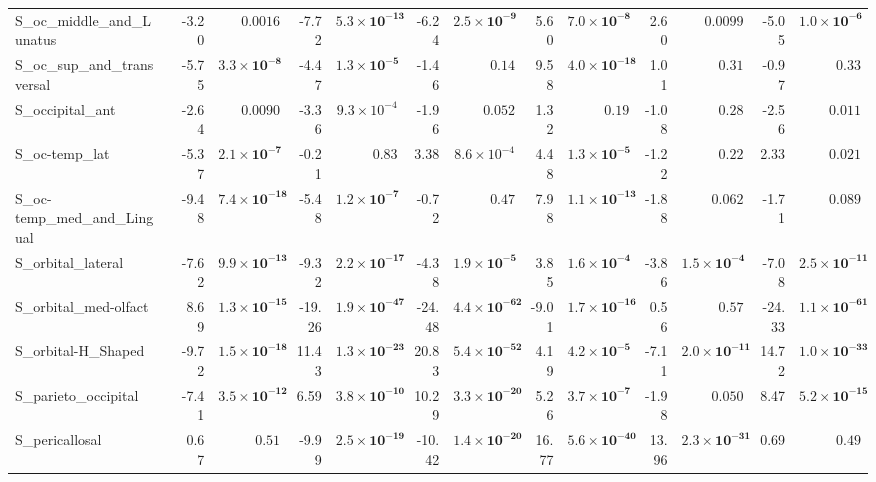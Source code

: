 {\begin{longtable}{llrrrrrrrrrrrr}
S\_oc\_middle\_and\_Lunatus &  & -3.20 & $0.0016$ & -7.72 & $\mathbf{5.3{\times}10^{-13}}$ & -6.24 & $\mathbf{2.5{\times}10^{-9}}$ & 5.60 & $\mathbf{7.0{\times}10^{-8}}$ & 2.60 & $0.0099$ & -5.05 & $\mathbf{1.0{\times}10^{-6}}$ \\
S\_oc\_sup\_and\_transversal &  & -5.75 & $\mathbf{3.3{\times}10^{-8}}$ & -4.47 & $\mathbf{1.3{\times}10^{-5}}$ & -1.46 & $0.14$ & 9.58 & $\mathbf{4.0{\times}10^{-18}}$ & 1.01 & $0.31$ & -0.97 & $0.33$ \\
S\_occipital\_ant &  & -2.64 & $0.0090$ & -3.36 & $9.3{\times}10^{-4}$ & -1.96 & $0.052$ & 1.32 & $0.19$ & -1.08 & $0.28$ & -2.56 & $0.011$ \\
S\_oc-temp\_lat &  & -5.37 & $\mathbf{2.1{\times}10^{-7}}$ & -0.21 & $0.83$ & 3.38 & $8.6{\times}10^{-4}$ & 4.48 & $\mathbf{1.3{\times}10^{-5}}$ & -1.22 & $0.22$ & 2.33 & $0.021$ \\
S\_oc-temp\_med\_and\_Lingual &  & -9.48 & $\mathbf{7.4{\times}10^{-18}}$ & -5.48 & $\mathbf{1.2{\times}10^{-7}}$ & -0.72 & $0.47$ & 7.98 & $\mathbf{1.1{\times}10^{-13}}$ & -1.88 & $0.062$ & -1.71 & $0.089$ \\
S\_orbital\_lateral &  & -7.62 & $\mathbf{9.9{\times}10^{-13}}$ & -9.32 & $\mathbf{2.2{\times}10^{-17}}$ & -4.38 & $\mathbf{1.9{\times}10^{-5}}$ & 3.85 & $\mathbf{1.6{\times}10^{-4}}$ & -3.86 & $\mathbf{1.5{\times}10^{-4}}$ & -7.08 & $\mathbf{2.5{\times}10^{-11}}$ \\
S\_orbital\_med-olfact &  & 8.69 & $\mathbf{1.3{\times}10^{-15}}$ & -19.26 & $\mathbf{1.9{\times}10^{-47}}$ & -24.48 & $\mathbf{4.4{\times}10^{-62}}$ & -9.01 & $\mathbf{1.7{\times}10^{-16}}$ & 0.56 & $0.57$ & -24.33 & $\mathbf{1.1{\times}10^{-61}}$ \\
S\_orbital-H\_Shaped &  & -9.72 & $\mathbf{1.5{\times}10^{-18}}$ & 11.43 & $\mathbf{1.3{\times}10^{-23}}$ & 20.83 & $\mathbf{5.4{\times}10^{-52}}$ & 4.19 & $\mathbf{4.2{\times}10^{-5}}$ & -7.11 & $\mathbf{2.0{\times}10^{-11}}$ & 14.72 & $\mathbf{1.0{\times}10^{-33}}$ \\
S\_parieto\_occipital &  & -7.41 & $\mathbf{3.5{\times}10^{-12}}$ & 6.59 & $\mathbf{3.8{\times}10^{-10}}$ & 10.29 & $\mathbf{3.3{\times}10^{-20}}$ & 5.26 & $\mathbf{3.7{\times}10^{-7}}$ & -1.98 & $0.050$ & 8.47 & $\mathbf{5.2{\times}10^{-15}}$ \\
S\_pericallosal &  & 0.67 & $0.51$ & -9.99 & $\mathbf{2.5{\times}10^{-19}}$ & -10.42 & $\mathbf{1.4{\times}10^{-20}}$ & 16.77 & $\mathbf{5.6{\times}10^{-40}}$ & 13.96 & $\mathbf{2.3{\times}10^{-31}}$ & 0.69 & $0.49$ \\

\end{longtable}}
